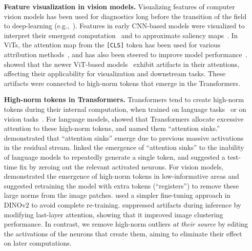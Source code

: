 \documentclass{article}
\begin{document}
\textbf{Feature visualization in vision models.} Visualizing features of computer vision models has been used for diagnostics long before the transition of the field to deep-learning (e.g.,~\cite{vondrick2013hoggles}). Features in early CNN-based models were visualized to interpret their emergent computation~\citep{zeiler2014visualizing,8099837} and to approximate saliency maps~\citep{itti2002model}. In ViTs, the attention map from the \texttt{[CLS]} token has been used for various attribution methods~\citep{caron2021emerging,Chefer_2021_CVPR}, and has also been steered to improve model performance~\citep{shi2023toasttransferlearningattention}. \cite{darcet2024vision} showed that the newer ViT-based models~\citep{dinov2,radford2021learning} exhibit artifacts in their attentions, affecting their applicability for visualization and downstream tasks. These artifacts were connected to high-norm tokens that emerge in the Transformers.


\textbf{High-norm tokens in Transformers.} Transformers tend to create high-norm tokens during their internal computation, when trained on language tasks~\citep{xiaoefficient} or on vision tasks~\citep{darcet2024vision}. For language models, \cite{xiaoefficient} showed that Transformers allocate excessive attention to these high-norm tokens, and named them ``attention sinks.'' \cite{sunmassive} demonstrated that ``attention sinks'' emerge due to previous massive activations in the residual stream. \cite{yona2025interpreting} linked the emergence of ``attention sinks'' to the inability of language models to repeatedly generate a single token, and suggested a test-time fix by zeroing out the relevant activated neurons. For vision models, \cite{darcet2024vision} demonstrated the emergence of high-norm tokens in low-informative areas and suggested retraining the model with extra tokens (``registers'') to remove these large norms from the image patches. \cite{wang2024sinder} used a simpler fine-tuning approach in DINOv2 to avoid complete re-training. \cite{nakamuraclustering} suppressed artifacts during inference by modifying last-layer attention, showing that it improved image clustering performance. In contrast, we remove high-norm outliers \textit{at their source} by editing the activations of the neurons that create them, aiming to eliminate their effect on later computations.
\end{document}
